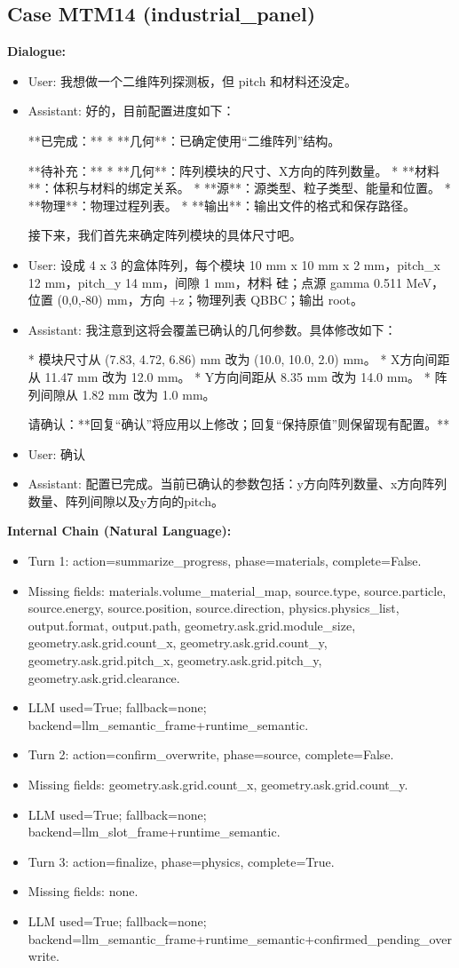 \documentclass[11pt]{ctexart}
\begin{document}
\subsection{Case MTM14 (industrial\_panel)}
\textbf{Dialogue:}
\begin{itemize}
\item User: 我想做一个二维阵列探测板，但 pitch 和材料还没定。
\item Assistant: 好的，目前配置进度如下：

**已完成：**
*   **几何**：已确定使用“二维阵列”结构。

**待补充：**
*   **几何**：阵列模块的尺寸、X方向的阵列数量。
*   **材料**：体积与材料的绑定关系。
*   **源**：源类型、粒子类型、能量和位置。
*   **物理**：物理过程列表。
*   **输出**：输出文件的格式和保存路径。

接下来，我们首先来确定阵列模块的具体尺寸吧。
\item User: 设成 4 x 3 的盒体阵列，每个模块 10 mm x 10 mm x 2 mm，pitch\_x 12 mm，pitch\_y 14 mm，间隙 1 mm，材料 硅；点源 gamma 0.511 MeV，位置 (0,0,-80) mm，方向 +z；物理列表 QBBC；输出 root。
\item Assistant: 我注意到这将会覆盖已确认的几何参数。具体修改如下：

*   模块尺寸从 (7.83, 4.72, 6.86) mm 改为 (10.0, 10.0, 2.0) mm。
*   X方向间距从 11.47 mm 改为 12.0 mm。
*   Y方向间距从 8.35 mm 改为 14.0 mm。
*   阵列间隙从 1.82 mm 改为 1.0 mm。

请确认：**回复“确认”将应用以上修改；回复“保持原值”则保留现有配置。**
\item User: 确认
\item Assistant: 配置已完成。当前已确认的参数包括：y方向阵列数量、x方向阵列数量、阵列间隙以及y方向的pitch。
\end{itemize}
\textbf{Internal Chain (Natural Language):}
\begin{itemize}
\item Turn 1: action=summarize\_progress, phase=materials, complete=False.
\item Missing fields: materials.volume\_material\_map, source.type, source.particle, source.energy, source.position, source.direction, physics.physics\_list, output.format, output.path, geometry.ask.grid.module\_size, geometry.ask.grid.count\_x, geometry.ask.grid.count\_y, geometry.ask.grid.pitch\_x, geometry.ask.grid.pitch\_y, geometry.ask.grid.clearance.
\item LLM used=True; fallback=none; backend=llm\_semantic\_frame+runtime\_semantic.
\item Turn 2: action=confirm\_overwrite, phase=source, complete=False.
\item Missing fields: geometry.ask.grid.count\_x, geometry.ask.grid.count\_y.
\item LLM used=True; fallback=none; backend=llm\_slot\_frame+runtime\_semantic.
\item Turn 3: action=finalize, phase=physics, complete=True.
\item Missing fields: none.
\item LLM used=True; fallback=none; backend=llm\_semantic\_frame+runtime\_semantic+confirmed\_pending\_overwrite.
\end{itemize}
\end{document}
